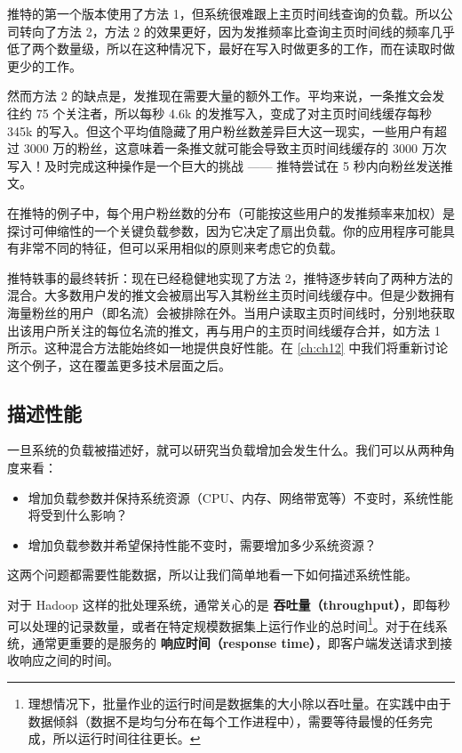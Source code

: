 推特的第一个版本使用了方法 1，但系统很难跟上主页时间线查询的负载。所以公司转向了方法 2，方法 2 的效果更好，因为发推频率比查询主页时间线的频率几乎低了两个数量级，所以在这种情况下，最好在写入时做更多的工作，而在读取时做更少的工作。

然而方法 2 的缺点是，发推现在需要大量的额外工作。平均来说，一条推文会发往约 75 个关注者，所以每秒 4.6k 的发推写入，变成了对主页时间线缓存每秒 345k 的写入。但这个平均值隐藏了用户粉丝数差异巨大这一现实，一些用户有超过 3000 万的粉丝，这意味着一条推文就可能会导致主页时间线缓存的 3000 万次写入！及时完成这种操作是一个巨大的挑战 —— 推特尝试在 5 秒内向粉丝发送推文。

在推特的例子中，每个用户粉丝数的分布（可能按这些用户的发推频率来加权）是探讨可伸缩性的一个关键负载参数，因为它决定了扇出负载。你的应用程序可能具有非常不同的特征，但可以采用相似的原则来考虑它的负载。

推特轶事的最终转折：现在已经稳健地实现了方法 2，推特逐步转向了两种方法的混合。大多数用户发的推文会被扇出写入其粉丝主页时间线缓存中。但是少数拥有海量粉丝的用户（即名流）会被排除在外。当用户读取主页时间线时，分别地获取出该用户所关注的每位名流的推文，再与用户的主页时间线缓存合并，如方法 1 所示。这种混合方法能始终如一地提供良好性能。在 \autoref{ch:ch12} 中我们将重新讨论这个例子，这在覆盖更多技术层面之后。

\subsection{描述性能}

一旦系统的负载被描述好，就可以研究当负载增加会发生什么。我们可以从两种角度来看：

\begin{itemize}

  \item 增加负载参数并保持系统资源（CPU、内存、网络带宽等）不变时，系统性能将受到什么影响？

  \item 增加负载参数并希望保持性能不变时，需要增加多少系统资源？

\end{itemize}

这两个问题都需要性能数据，所以让我们简单地看一下如何描述系统性能。

对于 Hadoop 这样的批处理系统，通常关心的是 \textbf{吞吐量（throughput）}，即每秒可以处理的记录数量，或者在特定规模数据集上运行作业的总时间\footnote{理想情况下，批量作业的运行时间是数据集的大小除以吞吐量。在实践中由于数据倾斜（数据不是均匀分布在每个工作进程中），需要等待最慢的任务完成，所以运行时间往往更长。}。对于在线系统，通常更重要的是服务的 \textbf{响应时间（response time）}，即客户端发送请求到接收响应之间的时间。

